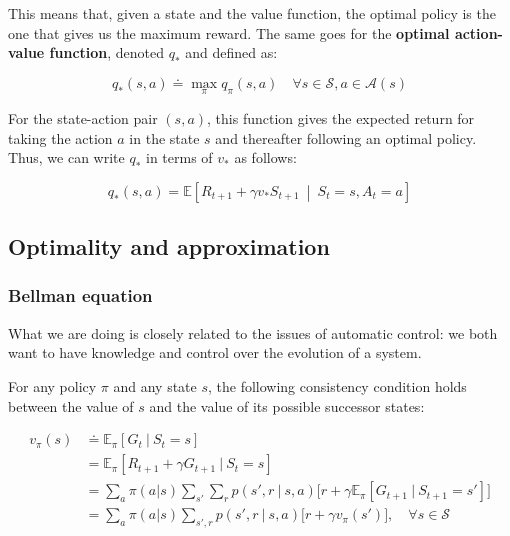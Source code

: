 This means that, given a state and the value function, the optimal policy is the one that gives us the maximum reward. The same goes for the \textbf{optimal action-value function}, denoted $q_*$ and defined as:

\begin{equation}
    q_*(s,a) \doteq \max_\pi q_\pi(s,a) \quad \forall s \in \mathcal{S}, a \in \mathcal{A}(s)
    \label{eq:ch2-optimalactionvaluefunction}
\end{equation}

For the state-action pair $(s,a)$, this function gives the expected return for taking the action $a$ in the state $s$ and thereafter following an optimal policy. Thus, we can write $q_*$ in terms of $v_*$ as follows:

\begin{equation*}
    q_*(s,a) = \mathbb{E} \left[ R_{t+1} + \gamma v_* S_{t+1} \  \middle\vert \ S_t = s, A_t = a \right]
\end{equation*}

\subsection{Optimality and approximation}
\subsubsection{Bellman equation}
What we are doing is closely related to the issues of automatic control: we both want to have knowledge and control over the evolution of a system.

For any policy $\pi$ and any state $s$, the following consistency condition holds between the value of $s$ and the value of its possible successor states:

\begin{equation}
    \begin{split}
        v_\pi(s) & \doteq \mathbb{E}_\pi \left[ G_t \ \vert \ S_t = s \right] \\
        & = \mathbb{E}_\pi \left[ R_{t+1} + \gamma G_{t+1} \ \vert \ S_t = s \right] \\
        & = \sum_{a} \pi(a \vert s) \sum_{s'} \sum_{r} p(s',r \ \vert \ s,a) \Big[ r + \gamma \mathbb{E}_\pi \left[ G_{t+1} \ \vert \ S_{t+1} = s' \right] \Big] \\
        & = \sum_{a} \pi (a \vert s) \sum_{s', r} p(s', r \ \vert \ s,a) \Big[ r + \gamma v_\pi(s') \Big], \quad \forall s \in \mathcal{S}
    \end{split}
    \label{eq:ch2-bellmanequation}
\end{equation}


